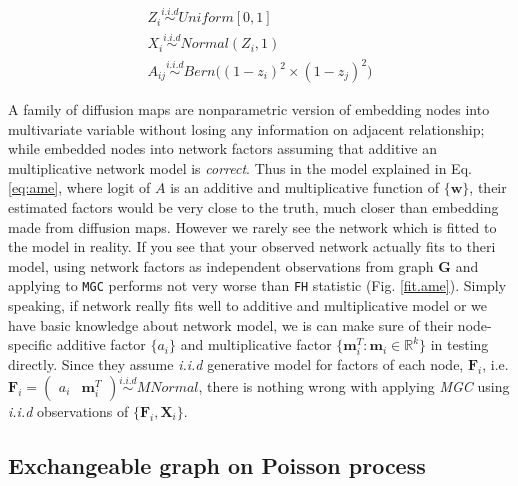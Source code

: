 \documentclass[12pt]{article}
\theoremstyle{definition}
\begin{document}
\begin{equation}
\label{eq:ame}
\begin{gathered}
	Z_{i} \overset{i.i.d}{\sim} Uniform[0,1] \\ 
	X_{i} \overset{i.i.d}{\sim} Normal(Z_{i}, 1) \\
	A_{ij}  \overset{i.i.d}{\sim} Bern \big(  ( 1 - z_{i})^2 \times (1 - z_{j})^2    \big)
\end{gathered}
\end{equation}


A family of diffusion maps are nonparametric version of embedding nodes into multivariate variable without losing any information on adjacent relationship; while \cite{fosdick2015testing} embedded nodes into network factors assuming that additive an multiplicative network model is \textit{correct}. Thus in the model explained in Eq. \ref{eq:ame}, where logit of $A$ is an additive and multiplicative function of $\{\mathbf{w} \}$, their estimated factors would be very close to the truth, much closer than embedding made from diffusion maps. However we rarely see the network which is fitted to the model in reality. If you see that your observed network actually fits to theri model, using network factors as independent observations from graph $\mathbf{G}$ and applying to \texttt{MGC} performs not very worse than \texttt{FH} statistic (Fig. \ref{fit.ame}).
Simply speaking, if network really fits well to additive and multiplicative model or we have basic knowledge about network model, we is can make sure of their node-specific additive factor $\{ a_{i} \}$ and multiplicative factor $\{ \mathbf{m}^{T}_{i} : \mathbf{m}_{i} \in \mathbb{R}^{k} \}$ in testing directly. Since they assume \textit{i.i.d} generative model for factors of each node, $\mathbf{F}_{i}$, i.e. $\mathbf{F}_{i} = \begin{pmatrix} a_{i} & \mathbf{m}^{T}_{i} \end{pmatrix} \overset{i.i.d}{\sim} MNormal$, there is nothing wrong with applying \textit{MGC} using \textit{i.i.d} observations of $\{ \mathbf{F}_{i}, \mathbf{X}_{i} \}$.   
	


\subsection{Exchangeable graph on Poisson process}
\end{document}
